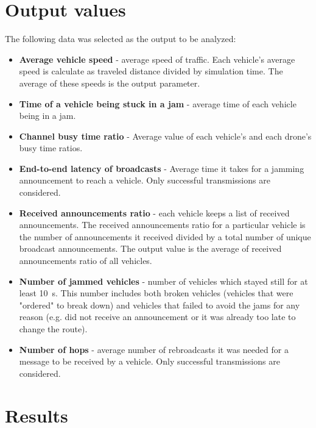 \documentclass[]{nsm-thesis}
\begin{document}
\section{Output values}

The following data was selected as the output to be analyzed:

\begin{itemize}

	\item \textbf{Average vehicle speed} - average speed of traffic. Each vehicle's average speed is calculate as traveled distance divided by simulation time. The average of these speeds is the output parameter.
	
	\item \textbf{Time of a vehicle being stuck in a jam} - average time of each vehicle being in a jam.
	
	\item \textbf{Channel busy time ratio} - Average value of each vehicle's and each drone's busy time ratios.

	\item \textbf{End-to-end latency of broadcasts} - Average time it takes for a jamming announcement to reach a vehicle. Only successful transmissions are considered.

	\item \textbf{Received announcements ratio} - each vehicle keeps a list of received announcements. The received announcements ratio for a particular vehicle is the number of announcements it received divided by a total number of unique broadcast announcements. The output value is the average of received announcements ratio of all vehicles.

	\item \textbf{Number of jammed vehicles} - number of vehicles which stayed still for at least \SI{10}{\second}. This number includes both broken vehicles (vehicles that were "ordered" to break down) and vehicles that failed to avoid the jams for any reason (e.g. did not receive an announcement or it was already too late to change the route).

	\item \textbf{Number of hops} - average number of rebroadcasts it was needed for a message to be received by a vehicle. Only successful transmissions are considered.

\end{itemize}

\section{Results}
\end{document}
